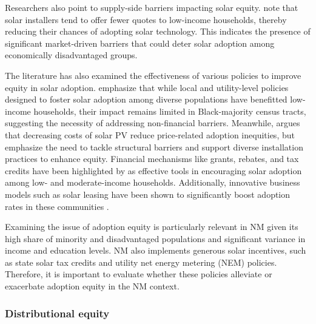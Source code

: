 \documentclass[11pt,twoside,letterpaper]{article}
\begin{document}
Researchers also point to supply-side barriers impacting solar equity. \textcite{oshaughnessy_income-targeted_2021} note that solar installers tend to offer fewer quotes to low-income households, thereby reducing their chances of adopting solar technology. This indicates the presence of significant market-driven barriers that could deter solar adoption among economically disadvantaged groups.

 The literature has also examined the effectiveness of various policies to improve equity in solar adoption. \textcite{gao_solar_2022} emphasize that while local and utility-level policies designed to foster solar adoption among diverse populations have benefitted low-income households, their impact remains limited in Black-majority census tracts, suggesting the necessity of addressing non-financial barriers. Meanwhile, \textcite{darghouth_characterizing_2022} argues that decreasing costs of solar PV reduce price-related adoption inequities, but emphasize the need to tackle structural barriers and support diverse installation practices to enhance equity. Financial mechanisms like grants, rebates, and tax credits have been highlighted by \textcite{oshaughnessy_rooftop_2022} as effective tools in encouraging solar adoption among low- and moderate-income households. Additionally, innovative business models such as solar leasing have been shown to significantly boost adoption rates in these communities \parencite{oshaughnessy_impact_2021}.

Examining the issue of adoption equity is particularly relevant in NM given its high share of minority and disadvantaged populations and significant variance in income and education levels. NM also implements generous solar incentives, such as state solar tax credits and utility net energy metering (NEM) policies. Therefore, it is important to evaluate whether these policies alleviate or exacerbate adoption equity in the NM context.

\subsubsection{Distributional equity}
\end{document}
